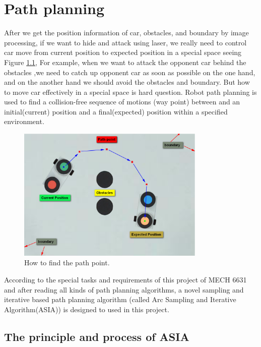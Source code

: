 \chapter{Path planning}
\label{cha:PathPlaning}

After we get the position information of car, obstacles, and boundary by image processing, if we want to hide and attack using laser, we really need to control car move from current position to expected position in a special space seeing Figure \ref{pathpoint},
For example, when we want to attack the opponent car behind the obstacles ,we need to catch up opponent car as soon as possible on the one hand, and on the another hand we should avoid the obstacles and boundary. But how to move car effectively in a special space is hard question. Robot path planning is used to find a collision-free sequence of motions (way point) between and an initial(current) position and a final(expected) position within a specified environment.

\begin{figure}[thb]
    \centering
    \includegraphics[width=0.8\textwidth]{images/PathPlaningPathPoint.png}
    \caption[How to find the path point]{How to find the path point.}\label{pathpoint}
\end{figure}

According to the special tasks and requirements of this project of MECH 6631 and after reading all kinds of path planning algorithms, a novel sampling and iterative based path planning algorithm (called Arc Sampling and Iterative Algorithm(ASIA)) is designed to used in this project.

\section{The principle and process of ASIA}


